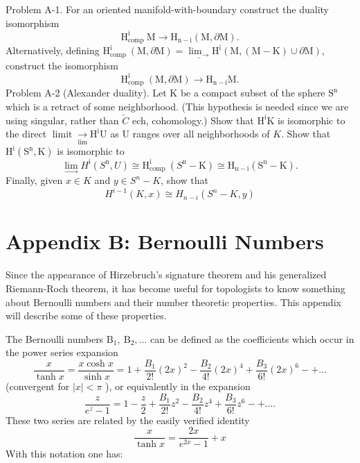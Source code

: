 \documentclass[10pt]{article}
\begin{document}
Problem A-1. For an oriented manifold-with-boundary construct the duality isomorphism
$$
\mathrm{H}_{\text {comp }}^{\mathrm{i}} \mathrm{M} \rightarrow \mathrm{H}_{\mathrm{n}-\mathrm{i}}(\mathrm{M}, \partial \mathrm{M}) .
$$
Alternatively, defining $\mathrm{H}_{\text {comp }}^{\mathrm{i}}(\mathrm{M}, \partial \mathrm{M})=\underline{\lim _{\longrightarrow}} \mathrm{H}^{\mathrm{i}}(\mathrm{M},(\mathrm{M}-\mathrm{K}) \cup \partial \mathrm{M})$, construct the isomorphism
$$
\mathrm{H}_{\text {comp }}^{\mathrm{i}}(\mathrm{M}, \partial \mathrm{M}) \rightarrow \mathrm{H}_{\mathrm{n}-\mathrm{i}} \mathrm{M} .
$$
Problem A-2 (Alexander duality). Let $\mathrm{K}$ be a compact subset of the sphere $\mathrm{S}^{\mathrm{n}}$ which is a retract of some neighborhood. (This hypothesis is needed since we are using singular, rather than $\check{C}$ ech, cohomology.) Show that $\mathrm{H}^{\mathrm{i}} \mathrm{K}$ is isomorphic to the direct $\operatorname{limit} \underset{\lim }{\longrightarrow} \mathrm{H}^{\mathrm{i}} \mathrm{U}$ as $\mathrm{U}$ ranges over all neighborhoods of $K$. Show that $\mathrm{H}^{\mathrm{i}}\left(\mathrm{S}^{\mathrm{n}}, \mathrm{K}\right)$ is isomorphic to
$$
\lim _{\longrightarrow} H^{\mathrm{i}}\left(S^{\mathrm{n}}, U\right) \cong \mathrm{H}_{\text {comp }}^{\mathrm{i}}\left(S^{\mathrm{n}}-\mathrm{K}\right) \cong \mathrm{H}_{\mathrm{n}-\mathrm{i}}\left(\mathrm{S}^{\mathrm{n}}-\mathrm{K}\right) .
$$
Finally, given $x \in K$ and $y \in S^{n}-K$, show that
$$
H^{i-1}(K, x) \cong H_{n-i}\left(S^{n}-K, y\right)
$$

\section{Appendix B: Bernoulli Numbers}
Since the appearance of Hirzebruch's signature theorem and his generalized Riemann-Roch theorem, it has become useful for topologists to know something about Bernoulli numbers and their number theoretic properties. This appendix will describe some of these properties.

The Bernoulli numbers $\mathrm{B}_{1}, \mathrm{~B}_{2}, \ldots$ can be defined as the coefficients which occur in the power series expansion
$$
\frac{x}{\tanh x}=\frac{x \cosh x}{\sinh x}=1+\frac{B_{1}}{2 !}(2 x)^{2}-\frac{B_{2}}{4 !}(2 x)^{4}+\frac{B_{3}}{6 !}(2 x)^{6}-+\ldots
$$
(convergent for $|x|<\pi$ ), or equivalently in the expansion
$$
\frac{z}{e^{z}-1}=1-\frac{z}{2}+\frac{B_{1}}{2 !} z^{2}-\frac{B_{2}}{4 !} z^{4}+\frac{B_{3}}{6 !} z^{6}-+\ldots .
$$
These two series are related by the easily verified identity
$$
\frac{x}{\tanh x}=\frac{2 x}{e^{2 x}-1}+x
$$
With this notation one has:
\end{document}
